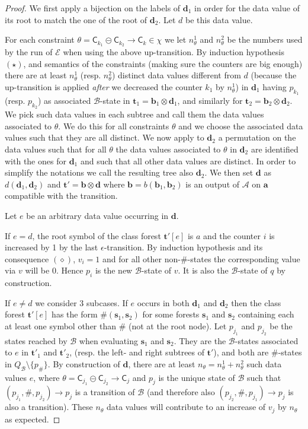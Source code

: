 \documentclass{CSML}
\newcommand\Aa{\mathcal{A}}
\newcommand\Ba{\mathcal{B}}
\newcommand\Ea{\mathcal{E}}
\newcommand\merc[3]{\mathsf{C}_{#1}\mathpunct{\circleddash}\mathsf{C}_{#2}\to\mathsf{C}_{#3}}
\newcommand\tree{\boldsymbol{t}}
\newcommand\atree{\boldsymbol{a}}
\newcommand\btree{\boldsymbol{b}}
\newcommand\dtree{\boldsymbol{d}}
\newcommand\stree{\boldsymbol{s}}
\newcommand\rootstate{$\Ba$-state\xspace}
\begin{document}
\begin{proof}
We first apply a bijection on the labels of $\dtree_1$ in order for the data
value of its root to match the one of the root of $\dtree_2$. Let $d$ be this
data value.

For each constraint $\theta=\merc{k_1}{k_2}{k} \in \chi$ 
we let $n^1_\theta$ and $n^2_\theta$ be the numbers used by the run of $\Ea$ when using
the above up-transition.  By induction hypothesis $(\star)$, and semantics of the
constraints (making sure the counters are big enough) there are at least
$n^1_\theta$ (resp. $n^2_\theta$) distinct data values different from $d$
(because the up-transition is applied \emph{after} we decreased the counter $k_1$ by $n^1_\theta$) 
in $\dtree_1$ having $p_{k_1}$ (resp. $p_{k_2}$) as associated
$\Ba$-state in $\tree_1 = \btree_1\otimes\dtree_1$, 
and similarly for $\tree_2 = \btree_2\otimes\dtree_2$.  
We pick such data values in each subtree 
and call them the data values associated to $\theta$.  
We do this for all constraints $\theta$ 
and we choose the associated data values such that they are all distinct.  
We now apply to $\dtree_2$ a permutation on the data values 
such that for all $\theta$ the data values associated to $\theta$ in $\dtree_2$ 
are identified with the ones for $\dtree_1$ and such that all other
data values are distinct.  In order to simplify the notations we call the
resulting tree also $\dtree_2$.  We then set $\dtree$ as $d(\dtree_1,\dtree_2)$
and $\tree'=\btree\otimes\dtree$ where $\btree = b(\btree_1, \btree_2)$ 
is an output of $\Aa$ on $\atree$ compatible with the transition.

Let $e$ be an arbitrary data value occurring in $\dtree$.

If $e = d$, the root symbol of the class forest $\tree'[e]$ 
is $a$ and the counter $i$ is increased by 1 by the last $\epsilon$-transition.
By induction hypothesis and its consequence $(\diamond)$, 
$v_i = 1$ and for all other non-$\#$-states 
the corresponding value via $v$ will be 0. 
Hence $p_i$ is the new \rootstate of $v$. 
It is also the \rootstate of $q$ by construction.

If $e \neq d$ we consider 3 subcases. 
If $e$ occurs in both $\dtree_1$ and $\dtree_2$ 
then the class forest $\tree'[e]$ has the form $\#(\stree_1,\stree_2)$ 
for some forests $\stree_1$ and $\stree_2$
containing each at least one symbol other than $\#$ (not at the root node).
Let $p_{j_1}$ and $p_{j_2}$ be the states reached by $\Ba$ when evaluating $\stree_1$ and $\stree_2$.
They are the $\Ba$-states associated to $e$ in $\tree'_1$ and $\tree'_2$,
(resp. the left- and right subtrees of $\tree'$),
and both are $\#$-states in $Q_\Ba \setminus \{ p_\# \}$.
By construction of $\dtree$, there are at least
$n_\theta=n_\theta^1+n_\theta^2$ such data values $e$, 
where $\theta = \merc{j_1}{j_2}{j}$ 
and $p_j$ is the unique state of $\Ba$ such that 
$(p_{j_1}, \#, p_{j_2}) \to p_{j}$ is a transition of $\Ba$ (and
therefore also $(p_{j_2}, \#, p_{j_1}) \to p_j$ is also a transition). 
These $n_\theta$ data values will contribute to an increase of $v_j$ by $n_\theta$ as expected.


\end{proof}
\end{document}

